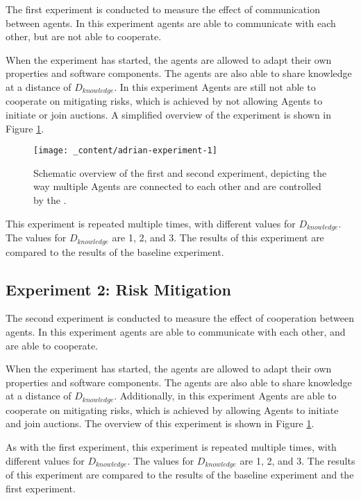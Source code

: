 The first experiment is conducted to measure the effect of communication between agents. In this experiment agents are able to communicate with each other,  but are not able to cooperate. 

When the experiment has started, the agents are allowed to adapt their own properties and software components. The agents are also able to share knowledge at a distance of \( D_{knowledge} \). In this experiment Agents are still not able to cooperate on mitigating risks, which is achieved by not allowing Agents to initiate or join auctions. A simplified overview of the experiment is shown in Figure \ref{fig:experiment-1}.

\begin{figure}[H]
    \centering
    \texttt{[image: \_content/adrian-experiment-1]}
    \caption{Schematic overview of the first and second experiment, depicting the way multiple Agents are connected to each other and are controlled by the .}
    \label{fig:experiment-1}
\end{figure}

This experiment is repeated multiple times, with different values for \( D_{knowledge} \). The values for \( D_{knowledge} \) are 1, 2, and 3. The results of this experiment are compared to the results of the baseline experiment.

\subsection{Experiment 2: Risk Mitigation}

The second experiment is conducted to measure the effect of cooperation between agents. In this experiment agents are able to communicate with each other, and are able to cooperate. 

When the experiment has started, the agents are allowed to adapt their own properties and software components. The agents are also able to share knowledge at a distance of \( D_{knowledge} \). Additionally, in this experiment Agents are able to cooperate on mitigating risks, which is achieved by allowing Agents to initiate and join auctions. The overview of this experiment is shown in Figure \ref{fig:experiment-1}.

As with the first experiment, this experiment is repeated multiple times, with different values for \( D_{knowledge} \). The values for \( D_{knowledge} \) are 1, 2, and 3. The results of this experiment are compared to the results of the baseline experiment and the first experiment.
